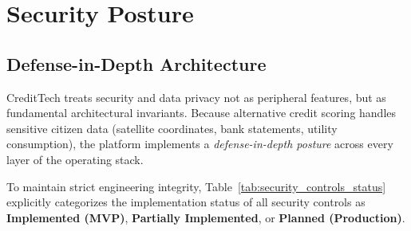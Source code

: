 \documentclass[11pt,a4paper,oneside]{report}
\begin{document}



\chapter{Security Posture}
\label{chap:security_posture}

\section{Defense-in-Depth Architecture}
CreditTech treats security and data privacy not as peripheral features, but as fundamental architectural invariants. Because alternative credit scoring handles sensitive citizen data (satellite coordinates, bank statements, utility consumption), the platform implements a \textit{defense-in-depth posture} across every layer of the operating stack. 

To maintain strict engineering integrity, Table~\ref{tab:security_controls_status} explicitly categorizes the implementation status of all security controls as \textbf{Implemented (MVP)}, \textbf{Partially Implemented}, or \textbf{Planned (Production)}.
\end{document}
